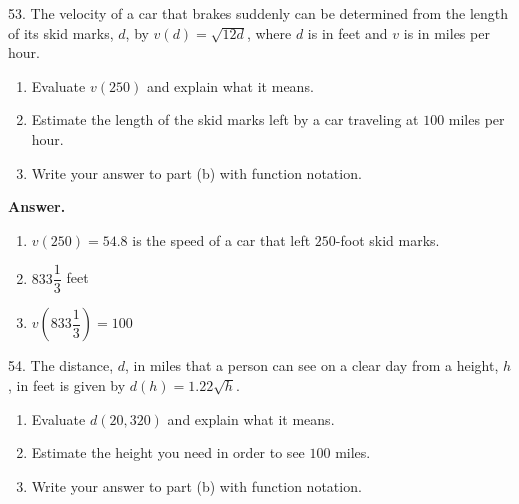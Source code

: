 \documentclass[10pt,]{book}
\theoremstyle{plain}
\theoremstyle{definition}
\theoremstyle{definition}
\theoremstyle{definition}
\theoremstyle{definition}
\numberwithin{equation}{part}
\begin{document}
\begin{exerciselist}
\begin{enumerate}[label=\alph*]
\end{enumerate}
%
\par\smallskip
\item[53.]\hypertarget{exercise-122}{}The velocity of a car that brakes suddenly can be determined from the length of its skid marks, \(d\), by \(v(d) = \sqrt{12d}\), where \(d\) is in feet and \(v\) is in miles per hour. \leavevmode%
\begin{enumerate}[label=\alph*]
\item\hypertarget{li-471}{}Evaluate \(v(250)\) and explain what it means.%
\item\hypertarget{li-472}{}Estimate the length of the skid marks left by a car traveling at \(100\) miles per hour.%
\item\hypertarget{li-473}{}Write your answer to part (b) with function notation.%
\end{enumerate}
%
\par\smallskip
\par\smallskip
\noindent\textbf{Answer.}\hypertarget{answer-70}{}\quad
\leavevmode%
\begin{enumerate}[label=\alph*]
\item\hypertarget{li-474}{}\(v(250) = 54.8\) is the speed of a car that left \(250\)-foot skid marks.%
\item\hypertarget{li-475}{}\(833\dfrac{1}{3}\) feet%
\item\hypertarget{li-476}{}\(v\left(833\dfrac{1}{3}\right)= 100\)%
\end{enumerate}
%
\item[54.]\hypertarget{exercise-123}{}The distance, \(d\), in miles that a person can see on a clear day from a height, \(h\), in feet is given by \(d(h) = 1.22\sqrt{h}\). \leavevmode%
\begin{enumerate}[label=\alph*]
\item\hypertarget{li-477}{}Evaluate \(d(20,320)\) and explain what it means.%
\item\hypertarget{li-478}{}Estimate the height you need in order to see \(100\) miles.%
\item\hypertarget{li-479}{}Write your answer to part (b) with function notation.%
\end{enumerate}
%
\par\smallskip

\end{exerciselist}
\end{document}

